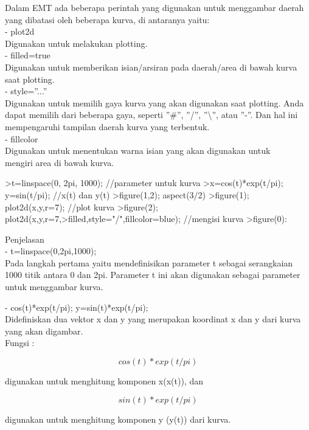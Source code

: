 \documentclass{article}
\begin{document}
\begin{eulernotebook}
\begin{eulercomment}
Dalam EMT ada beberapa perintah yang digunakan untuk menggambar daerah
yang dibatasi oleh beberapa kurva, di antaranya yaitu:\\
- plot2d\\
Digunakan untuk melakukan plotting.\\
- filled=true\\
Digunakan untuk memberikan isian/arsiran pada daerah/area di bawah
kurva saat plotting.\\
- style=”...”\\
Digunakan untuk memilih gaya kurva yang akan digunakan saat plotting.
Anda dapat memilih dari beberapa gaya, seperti ”#”, ”/”, ”\textbackslash{}”, atau
”-”. Dan hal ini mempengaruhi tampilan daerah kurva yang terbentuk.\\
- fillcolor\\
Digunakan untuk menentukan warna isian yang akan digunakan untuk\\
mengiri area di bawah kurva.
\end{eulercomment}
\begin{eulerprompt}
>t=linspace(0, 2pi, 1000); //parameter untuk kurva
>x=cos(t)*exp(t/pi); y=sin(t/pi); //x(t) dan y(t)
>figure(1,2); aspect(3/2)
>figure(1); plot2d(x,y,r=7); //plot kurva
>figure(2); plot2d(x,y,r=7,>filled,style="/",fillcolor=blue); //mengisi kurva
>figure(0):
\end{eulerprompt}
\begin{eulercomment}
Penjelasan\\
- t=linspace(0,2pi,1000);\\
Pada langkah pertama yaitu mendefinisikan parameter t sebagai
serangkaian 1000 titik antara 0 dan 2pi. Parameter t ini akan
digunakan sebagai parameter untuk menggambar kurva.

- cos(t)*exp(t/pi); y=sin(t)*exp(t/pi);\\
Didefiniskan dua vektor x dan y yang merupakan koordinat x dan y dari
kurva yang akan digambar.\\
Fungsi :\\
\end{eulercomment}
\begin{eulerformula}
\[
cos(t)*exp(t/pi)
\]
\end{eulerformula}
\begin{eulercomment}
digunakan untuk menghitung komponen x(x(t)), dan\\
\end{eulercomment}
\begin{eulerformula}
\[
sin(t)*exp(t/pi)
\]
\end{eulerformula}
\begin{eulercomment}
digunakan untuk menghitung komponen y (y(t)) dari kurva.


\end{eulercomment}
\end{eulernotebook}
\end{document}
